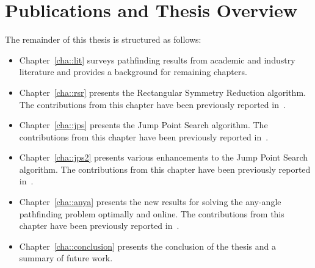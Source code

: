 \section{Publications and Thesis Overview}
\label{cha::intro::pubs}
The remainder of this thesis is structured as follows: 
\begin{itemize}
\item Chapter~\ref{cha::lit} surveys pathfinding results from 
academic and industry literature and provides a background for remaining chapters.
\item Chapter~\ref{cha::rsr} presents the Rectangular Symmetry Reduction algorithm.
The contributions from this chapter have been previously reported in~\citep{harabor10,harabor11a}.
\item Chapter~\ref{cha::jps} presents the Jump Point Search algorithm. 
The contributions from this chapter have been previously reported in~\citep{harabor11b,harabor12}.
\item Chapter~\ref{cha::jps2} presents various enhancements to the Jump Point Search algorithm.
The contributions from this chapter have been previously reported in~\citep{haraborG14}.
\item Chapter~\ref{cha::anya} presents the new results for solving the any-angle pathfinding problem
optimally and online.
The contributions from this chapter have been previously reported in~\citep{haraborG13}.
\item Chapter~\ref{cha::conclusion} presents the conclusion of the thesis and a summary of future work.
\end{itemize}

